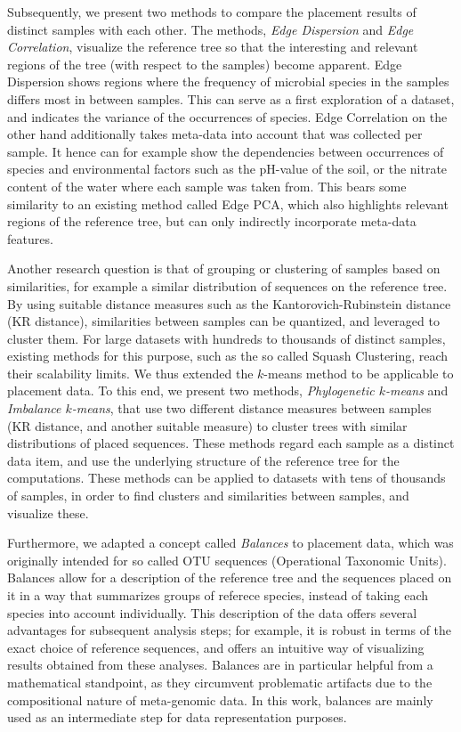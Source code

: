 Subsequently, we present two methods to compare the placement results of distinct samples with each other.
The methods, \emph{Edge Dispersion} and \emph{Edge Correlation}, visualize the reference tree so that
the interesting and relevant regions of the tree (with respect to the samples) become apparent.
Edge Dispersion shows regions where the frequency of microbial species in the samples differs most in between samples.
This can serve as a first exploration of a dataset, and indicates the variance of the occurrences of species.
Edge Correlation on the other hand additionally takes meta-data into account that was collected per sample.
It hence can for example show the dependencies between occurrences of species and environmental factors such as the
pH-value of the soil, or the nitrate content of the water where each sample was taken from.
This bears some similarity to an existing method called Edge PCA,
which also highlights relevant regions of the reference tree,
but can only indirectly incorporate meta-data features.

Another research question is that of grouping or clustering of samples based on similarities,
for example a similar distribution of sequences on the reference tree.
By using suitable distance measures such as the Kantorovich-Rubinstein distance (KR distance),
similarities between samples can be quantized, and leveraged to cluster them.
For large datasets with hundreds to thousands of distinct samples,
existing methods for this purpose, such as the so called Squash Clustering, reach their scalability limits.
We thus extended the $k$-means method to be applicable to placement data.
To this end, we present two methods, \emph{Phylogenetic $k$-means} and \emph{Imbalance $k$-means},
that use two different distance measures between samples (KR distance, and another suitable measure)
to cluster trees with similar distributions of placed sequences.
These methods regard each sample as a distinct data item,
and use the underlying structure of the reference tree for the computations.
These methods can be applied to datasets with tens of thousands of samples,
in order to find clusters and similarities between samples, and visualize these.

Furthermore, we adapted a concept called \emph{Balances} to placement data,
which was originally intended for so called OTU sequences (Operational Taxonomic Units).
Balances allow for a description of the reference tree and the sequences placed on it
in a way that summarizes groups of referece species, instead of taking each species into account individually.
This description of the data offers several advantages for subsequent analysis steps;
for example, it is robust in terms of the exact choice of reference sequences,
and offers an intuitive way of visualizing results obtained from these analyses.
Balances are in particular helpful from a mathematical standpoint,
as they circumvent problematic artifacts due to the compositional nature of meta-genomic data.
In this work, balances are mainly used as an intermediate step for data representation purposes.

